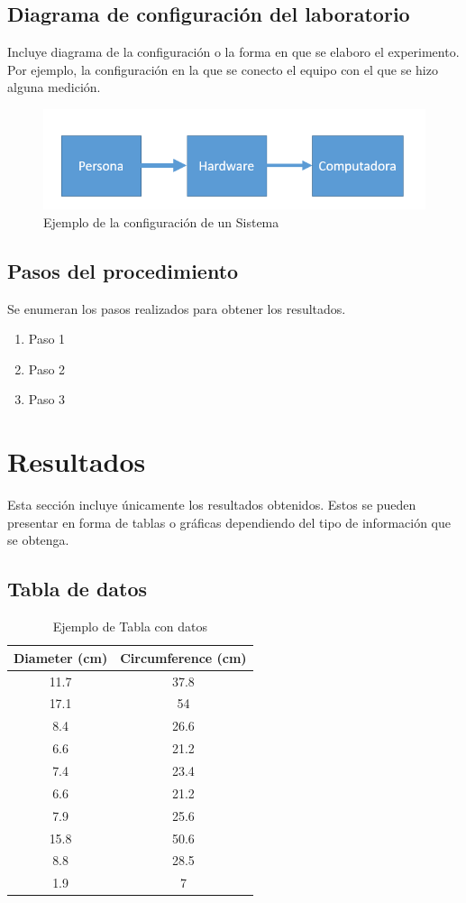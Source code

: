 \documentclass[article, 11pt]{IEEEtran}   %
\begin{document}
\subsection{Diagrama de configuraci\'on del laboratorio}
Incluye diagrama de la configuraci\'on o la forma en que se elaboro el experimento. Por ejemplo, la configuraci\'on en la que se conecto el equipo con el que se hizo alguna medici\'on. 

\begin{figure}[H]									%
\centering
\includegraphics[scale=0.7]{conf}%
\caption{Ejemplo de la configuraci\'on de un Sistema}\label{diagram1}  %
\end{figure}

\subsection{Pasos del procedimiento}        		
Se enumeran los pasos realizados para obtener los resultados. 
\begin{enumerate}						%
	\item Paso 1
	\item Paso 2
	\item Paso 3
\end{enumerate}

\section {Resultados}
Esta secci\'on incluye \'unicamente los resultados obtenidos. Estos se pueden presentar en forma de tablas o gr\'aficas dependiendo del tipo de informaci\'on que se obtenga.

\subsection{Tabla de datos}
\begin{table}[H]
\centering
\caption{Ejemplo de Tabla con datos}
\label{DataTable1}
\begin{tabular}{|c|c|}
\hline
Diameter (cm) & Circumference (cm) \\
\hline
11.7 & 37.8\\
17.1 & 54\\  
8.4 & 26.6\\
6.6 & 21.2\\
7.4 & 23.4\\
6.6 & 21.2\\
7.9 & 25.6\\
15.8 & 50.6\\
8.8 & 28.5\\
1.9 & 7\\
\hline   
\end{tabular}
\end{table}
\newpage
\end{document}
